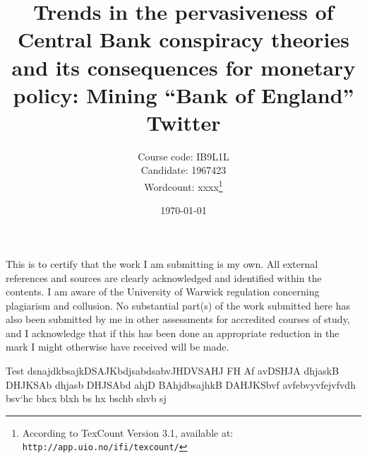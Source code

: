 \documentclass[10pt]{article}
\title{Trends in the pervasiveness of Central Bank conspiracy theories and its consequences for monetary policy: Mining ``Bank of England'' Twitter}
\author{Course code: IB9L1L\\
	    Candidate: 1967423\\
	    Wordcount: xxxx\footnote{According to TexCount Version 3.1, available at: \texttt{http://app.uio.no/ifi/texcount/}}}
\date{\today}
\begin{document}
\begin{titlepage}
	\centering
	\maketitle
{} 

\vspace{1in}

This is to certify that the work I am submitting is my own. All external references and sources are clearly acknowledged and identified within the contents. I am aware of the University of Warwick regulation concerning plagiarism and collusion.
No substantial part(s) of the work submitted here has also been submitted by me in other assessments for accredited courses of study, and I acknowledge that if this has been done an appropriate reduction in the mark I might otherwise have received will be made.
	
	\end{titlepage}

Test dsnajdkbsajkDSAJKbdjsabdsabvJHDVSAHJ FH Af avDSHJA dhjaskB DHJKSAb dhjasb DHJSAbd ahjD BAhjdbsajhkB DAHJKSbvf avfebvyvfejvfvdh bsv`hc bhcx blxh bs hx bschb shvb sj
\end{document}
